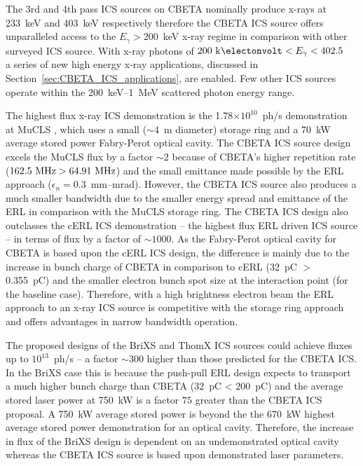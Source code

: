 \documentclass[../main.tex]{subfiles}
\begin{document}
The 3rd and 4th pass ICS sources on CBETA nominally produce x-rays at 233~\si{\kilo\electronvolt} and 403~\si{\kilo\electronvolt} respectively therefore the CBETA ICS source offers unparalleled access to the $E_{\gamma} > 200$~\si{\kilo\electronvolt} x-ray regime in comparison with other surveyed ICS source. With x-ray photons of $200~\textrm{\si{\kilo\electonvolt}} < E_{\gamma} < 402.5$~\si{\kilo\electonvolt} a series of new high energy x-ray applications, discussed in Section~\ref{sec:CBETA_ICS_applications}, are enabled. Few other ICS sources operate within the 200~\si{\kilo\electronvolt}--1~\si{\mega\electronvolt} scattered photon energy range.

The highest flux x-ray ICS demonstration is the 1.78$\times 10^{10}$~ph/\si{\second} demonstration at MuCLS \cite{eggl2016munich}, which uses a small ($\sim4$~\si{\meter} diameter) storage ring and a 70~\si{\kilo\watt} average stored power Fabry-Perot optical cavity. The CBETA ICS source design excels the MuCLS flux by a factor $\sim2$ because of CBETA's higher repetition rate ($162.5~\textrm{\si{\mega\hertz}} > 64.91~\textrm{\si{\mega\hertz}}$) and the small emittance made possible by the ERL approach ($\epsilon_{n}=0.3$~\si{\milli\meter}--\si{\milli\radian}). However, the CBETA ICS source also produces a much smaller bandwidth due to the smaller energy spread and emittance of the ERL in comparison with the MuCLS storage ring. The CBETA ICS design also outclasses the cERL ICS demonstration -- the highest flux ERL driven ICS source -- in terms of flux by a factor of $\sim1000$. As the Fabry-Perot optical cavity for CBETA is based upon the cERL ICS design, the difference is mainly due to the increase in bunch charge of CBETA in comparison to cERL (32~\si{\pico\coulomb} $>$ 0.355~\si{\pico\coulomb}) and the smaller electron bunch spot size at the interaction point (for the baseline case). Therefore, with a high brightness electron beam the ERL approach to an x-ray ICS source is competitive with the storage ring approach and offers advantages in narrow bandwidth operation. 

The proposed designs of the BriXS and ThomX ICS sources could achieve fluxes up to $10^{13}$~ph/\si{\second} -- a factor $\sim300$ higher than those predicted for the CBETA ICS. In the BriXS case this is because the push-pull ERL design expects to transport a much higher bunch charge than CBETA (32~\si{\pico\coulomb} < 200~\si{\pico\coulomb}) \cite{drebot2019brixs} and the average stored laser power at 750~\si{\kilo\watt} \cite{drebot2019brixs} is a factor $75$ greater than the CBETA ICS proposal. A 750~\si{\kilo\watt} average stored power is beyond the the 670~\si{\kilo\watt} highest average stored power demonstration \cite{carstens2014megawatt} for an optical cavity. Therefore, the increase in flux of the BriXS design is dependent on an undemonstrated optical cavity whereas the CBETA ICS source is based upon demonstrated laser parameters.
\end{document}

